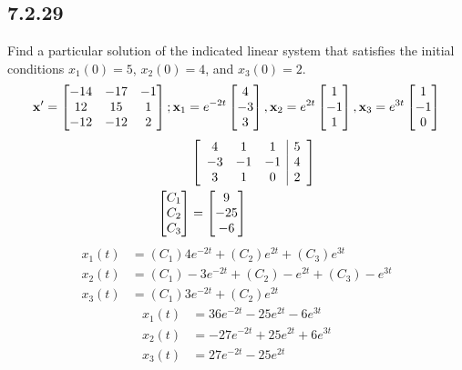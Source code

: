 \documentclass{article}
\begin{document}
\subsection{7.2.29}

Find a particular solution of the indicated linear system that satisfies the initial conditions $ x_1(0) = 5 $, $ x_2(0) = 4 $, and $ x_3(0) = 2 $.
\begin{equation*}
	\vect{x}' = \begin{bmatrix}
		-14 & -17 & -1 \\
		12 & 15 & 1 \\
		-12 & -12 & 2
	\end{bmatrix};
	\vect{x}_1 = e^{-2t} \begin{bmatrix} 4 \\ -3 \\ 3 \end{bmatrix},
	\vect{x}_2 = e^{2t} \begin{bmatrix} 1 \\ -1 \\ 1 \end{bmatrix},
	\vect{x}_3 = e^{3t} \begin{bmatrix} 1 \\ -1 \\ 0 \end{bmatrix}
\end{equation*}
\begin{align*}
	& \left[ \begin{array}{ c c c | c }
		4 & 1 & 1 & 5 \\
		-3 & -1 & -1 & 4 \\
		3 & 1 & 0 & 2
	\end{array} \right] \\
	\begin{bmatrix} C_1 \\ C_2 \\ C_3 \end{bmatrix}
	& = \begin{bmatrix} 9 \\ -25 \\ -6 \end{bmatrix}
\end{align*}
\begin{align*}
	x_1(t) & = (C_1)4e^{-2t} + (C_2)e^{2t} + (C_3)e^{3t} \\
	x_2(t) & = (C_1)-3e^{-2t} + (C_2)-e^{2t} + (C_3)-e^{3t} \\
	x_3(t) & = (C_1)3e^{-2t} + (C_2)e^{2t}
\end{align*}
\begin{align*}
	x_1(t) & = 36e^{-2t} - 25e^{2t} - 6e^{3t} \\
	x_2(t) & = -27e^{-2t} + 25e^{2t} + 6e^{3t} \\
	x_3(t) & = 27e^{-2t} - 25e^{2t}
\end{align*}
\end{document}
